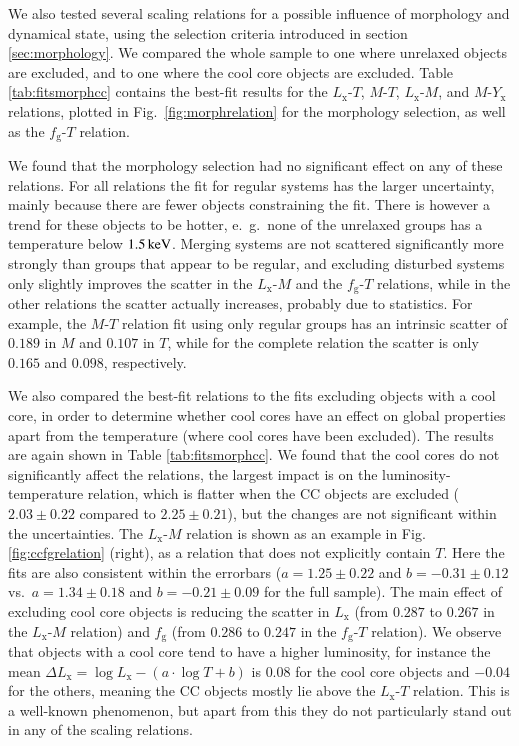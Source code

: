 \documentclass[structabstract]{aa}
\begin{document}
We also tested several scaling relations for a possible influence of
morphology and dynamical state, using the selection criteria
introduced in section \ref{sec:morphology}. We compared the whole
sample to one where unrelaxed objects are excluded, and to one
  where the cool core objects are excluded. Table
\ref{tab:fitsmorphcc} contains the best-fit results for the
$L_{\text{x}}$-$T$, $M$-$T$, $L_{\text{x}}$-$M$, and
$M$-$Y_{\text{x}}$ relations, plotted in Fig.\
\ref{fig:morphrelation} for the morphology selection, as well as
  the $f_{\text{g}}$-$T$ relation.

We found that the morphology selection had no significant effect on
any of these relations. For all relations the fit for regular systems
has the larger uncertainty, mainly because there are fewer objects
constraining the fit. There is however a trend for these objects to be
hotter, e.\ g.\ none of the unrelaxed groups has a temperature below
$\unit[1.5]{keV}$. Merging systems are not scattered
  significantly more strongly than groups that appear to be regular,
  and excluding disturbed systems only slightly improves the scatter in
  the $L_{\text{x}}$-$M$ and the $f_{\text{g}}$-$T$ relations, while
  in the other relations the scatter actually increases, probably due
  to statistics. For example, the $M$-$T$ relation fit using only
  regular groups has an intrinsic scatter of $0.189$ in $M$ and
  $0.107$ in $T$, while for the complete relation the scatter is only
  $0.165$ and $0.098$, respectively.

We also compared the best-fit relations to the fits excluding
  objects with a cool core, in order to determine whether cool cores
  have an effect on global properties apart from the temperature
  (where cool cores have been excluded). The results are again shown
  in Table \ref{tab:fitsmorphcc}. We found that the cool cores do not
  significantly affect the relations, the largest impact is on the
  luminosity-temperature relation, which is flatter when the CC
  objects are excluded ($2.03\pm0.22$ compared to $2.25\pm0.21$), but
  the changes are not significant within the uncertainties. The
  $L_{\text{x}}$-$M$ relation is shown as an example in
  Fig. \ref{fig:ccfgrelation} (right), as a relation that does not
  explicitly contain $T$. Here the fits are also consistent within the
  errorbars ($a=1.25\pm0.22$ and $b=-0.31\pm0.12$ vs.\ $a=1.34\pm0.18$
  and $b=-0.21\pm0.09$ for the full sample). The main effect of
  excluding cool core objects is reducing the scatter in
  $L_{\text{x}}$ (from $0.287$ to $0.267$ in the $L_{\text{x}}$-$M$
  relation) and $f_{\text{g}}$ (from $0.286$ to $0.247$ in the
  $f_{\text{g}}$-$T$ relation). We observe that objects with a cool
  core tend to have a higher luminosity, for instance the mean $\Delta
  L_{\text{x}}=\log L_{\text{x}}-\left(a\cdot \log T +b\right)$ is
  $0.08$ for the cool core objects and $-0.04$ for the others, meaning
  the CC objects mostly lie above the $L_{\text{x}}$-$T$
  relation. This is a well-known phenomenon, but apart from this they
  do not particularly stand out in any of the scaling relations.
%
%
%
\end{document}
